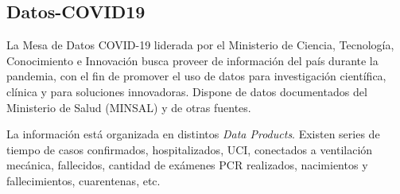 \subsection{Datos-COVID19}

La Mesa de Datos COVID-19 liderada por el Ministerio de Ciencia, Tecnología, Conocimiento e Innovación busca proveer de información del país durante la pandemia, con el fin de promover el uso de datos para investigación científica, clínica y para soluciones innovadoras. Dispone de datos documentados del Ministerio de Salud (MINSAL) y de otras fuentes.

La información está organizada en distintos \textit{Data Products}. Existen series de tiempo de casos confirmados, hospitalizados, UCI, conectados a ventilación mecánica, fallecidos, cantidad de exámenes PCR realizados, nacimientos y fallecimientos, cuarentenas, etc. 



